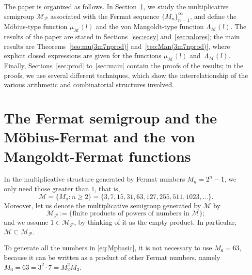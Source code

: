 \documentclass[11pt, a4paper]{article}
\newcommand{\calM}{\mathcal{M}}
\newcommand{\manM}{\Lambda_{\calM}}
\newcommand{\muM}{\mu_\calM}
\newcommand{\Mp}{\calM_{\mathcal{P}}}
\theoremstyle{plain}
\theoremstyle{definition}
\begin{document}
The paper is organized as follows. In Section~\ref{sec:MoManFer}, we study the multiplicative semigroup $\Mp$ associated with the Fermat sequence $\{M_n\}_{n=1}^\infty$, and define the M\"obius-type function $\muM(l)$ and the von Mangoldt-type function $\manM(l)$. 
The results of the paper are stated in Sections~\ref{sec:easy} and~\ref{sec:valores}; the main results are Theorems~\ref{teo:mu(3m7nprod)} and~\ref{teo:Man(3m7nprod)}, where explicit closed expressions are given for the functions $\muM(l)$ and~$\manM(l)$.
Finally, Sections~\ref{sec:prod} to~\ref{sec:main} contain the proofs of the results;
in the proofs, we use several different techniques, which show the interrelationship of the various arithmetic and combinatorial structures involved.

\section{The Fermat semigroup and the M\"o\-bius-Fer\-mat and the von Man\-goldt-Fer\-mat functions}
\label{sec:MoManFer}

In the multiplicative structure generated by Fermat numbers $M_n=2^n-1$, we only need those greater than $1$, that is, 
\[
  \calM = \{ M_{n} : n\ge2 \} = \{ 3, 7, 15, 31, 63, 127, 255, 511, 1023,\dots \}.
\]
Moreover, let us denote the multiplicative semigroup generated by $\calM$ by
\begin{equation}
\label{eq:Mpbasic}
  \Mp := \{\text{finite products of powers of numbers in $\calM$}\};
\end{equation}
and we assume $1 \in \Mp$, by thinking of it as the empty product. In particular, $\calM \subseteq \Mp$.

To generate all the numbers in \eqref{eq:Mpbasic}, it is not necessary to use $M_6=63$, because it can be written as a product of other Fermat numbers, namely $M_6 = 63 = 3^2 \cdot 7 = M_2^2 M_3$. 
\end{document}
